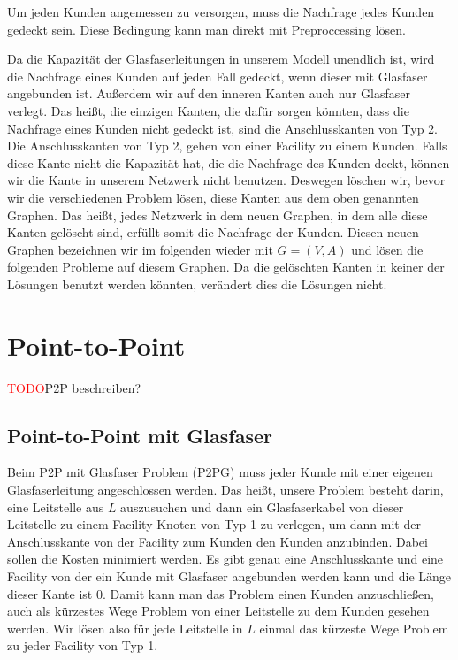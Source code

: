 \documentclass[11pt,a4paper]{article}
\newcommand{\TODO}{\textcolor{red}{TODO}}
\theoremstyle{my_th_style1}
\begin{document}
Um jeden Kunden angemessen zu versorgen, muss die Nachfrage jedes Kunden gedeckt sein. Diese Bedingung kann man direkt mit Preproccessing lösen.

Da die Kapazität der Glasfaserleitungen in unserem Modell unendlich ist, wird die Nachfrage eines Kunden auf jeden Fall gedeckt, wenn dieser mit Glasfaser angebunden ist. Außerdem wir auf den inneren Kanten auch nur Glasfaser verlegt. Das heißt, die einzigen Kanten, die dafür sorgen könnten, dass die Nachfrage eines Kunden nicht gedeckt ist, sind die Anschlusskanten von Typ 2. Die Anschlusskanten von Typ 2, gehen von einer Facility zu einem Kunden. Falls diese Kante nicht die Kapazität hat, die  die Nachfrage des Kunden deckt, können wir die Kante in unserem Netzwerk nicht benutzen. Deswegen löschen wir, bevor wir die verschiedenen Problem lösen, diese Kanten aus dem oben genannten Graphen. Das heißt, jedes Netzwerk in dem neuen Graphen, in dem alle diese Kanten gelöscht sind, erfüllt somit die Nachfrage der Kunden. Diesen neuen Graphen bezeichnen wir im folgenden wieder mit $G=(V,A)$ und lösen die folgenden Probleme auf diesem Graphen. Da die gelöschten Kanten in keiner der Lösungen benutzt werden könnten, verändert dies die Lösungen nicht.

\section{Point-to-Point}

\TODO P2P beschreiben?

\subsection{Point-to-Point mit Glasfaser}

Beim P2P mit Glasfaser Problem (P2PG) muss jeder Kunde mit einer eigenen Glasfaserleitung angeschlossen werden. Das heißt, unsere Problem besteht darin, eine Leitstelle aus $L$ auszusuchen und dann ein Glasfaserkabel von dieser Leitstelle zu einem Facility Knoten von Typ 1 zu verlegen, um dann mit der Anschlusskante von der Facility zum Kunden den Kunden anzubinden. Dabei sollen die Kosten minimiert werden. Es gibt genau eine Anschlusskante und eine Facility von der ein Kunde mit Glasfaser angebunden werden kann und die Länge dieser Kante ist 0. Damit kann man das Problem einen Kunden anzuschließen, auch als kürzestes Wege Problem von einer Leitstelle zu dem Kunden gesehen werden. Wir lösen also für jede Leitstelle in $L$ einmal das kürzeste Wege Problem zu jeder Facility von Typ 1.
\end{document}
